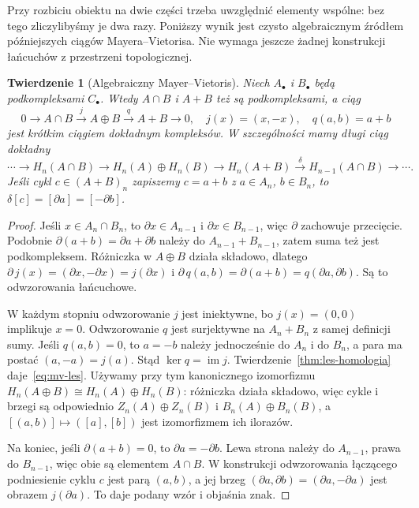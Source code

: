 \documentclass[11pt,a4paper,oneside]{report}
\theoremstyle{plain}
\newtheorem{twierdzenie}{Twierdzenie}[section]
\theoremstyle{definition}
\theoremstyle{remark}
\begin{document}
Przy rozbiciu obiektu na dwie części trzeba
uwzględnić elementy wspólne: bez tego
zliczylibyśmy je dwa razy. Poniższy wynik
jest czysto algebraicznym źródłem
późniejszych ciągów Mayera--Vietorisa.
Nie wymaga jeszcze żadnej konstrukcji
łańcuchów z przestrzeni topologicznej.

\begin{twierdzenie}[Algebraiczny Mayer--Vietoris]
\label{thm:mv-algebraiczny}
Niech $A_\bullet$ i $B_\bullet$ będą
podkompleksami $C_\bullet$. Wtedy
$A\cap B$ i $A+B$ też są podkompleksami,
a ciąg
\begin{equation}\label{eq:mv-ses}
 0\longrightarrow A\cap B
 \xrightarrow{\ j\ }A\oplus B
 \xrightarrow{\ q\ }A+B
 \longrightarrow0,
 \quad j(x)=(x,-x),\quad q(a,b)=a+b
\end{equation}
jest krótkim ciągiem dokładnym kompleksów.
W szczególności mamy długi ciąg dokładny
\begin{equation}\label{eq:mv-les}
 \cdots\to H_n(A\cap B)\to H_n(A)\oplus H_n(B)
 \to H_n(A+B)\xrightarrow{\delta}
 H_{n-1}(A\cap B)\to\cdots.
\end{equation}
Jeśli cykl $c\in(A+B)_n$ zapiszemy
$c=a+b$ z $a\in A_n$, $b\in B_n$,
to $\delta[c]=[\partial a]=[-\partial b]$.
\end{twierdzenie}
\begin{proof}
Jeśli $x\in A_n\cap B_n$, to
$\partial x\in A_{n-1}$ i $\partial x\in B_{n-1}$,
więc $\partial$ zachowuje przecięcie.
Podobnie $\partial(a+b)=\partial a+\partial b$ należy do
$A_{n-1}+B_{n-1}$, zatem suma
też jest podkompleksem.
Różniczka w $A\oplus B$ działa
składowo, dlatego
$\partial\,j(x)=(\partial x,-\partial x)=j(\partial x)$ i
$\partial\,q(a,b)=\partial(a+b)=q(\partial a,\partial b)$.
Są to odwzorowania łańcuchowe.

W każdym stopniu odwzorowanie $j$ jest
iniektywne, bo $j(x)=(0,0)$
implikuje $x=0$. Odwzorowanie $q$ jest
surjektywne na $A_n+B_n$ z samej
definicji sumy. Jeśli $q(a,b)=0$,
to $a=-b$ należy jednocześnie do
$A_n$ i do $B_n$, a para ma postać
$(a,-a)=j(a)$. Stąd
$\ker q=\operatorname{im}j$.
Twierdzenie~\ref{thm:les-homologia}
daje~\eqref{eq:mv-les}. Używamy przy tym kanonicznego izomorfizmu
$H_n(A\oplus B)\cong H_n(A)\oplus H_n(B)$:
różniczka działa składowo, więc cykle i brzegi są odpowiednio
$Z_n(A)\oplus Z_n(B)$ i $B_n(A)\oplus B_n(B)$,
a $[(a,b)]\mapsto([a],[b])$ jest izomorfizmem ich ilorazów.

Na koniec, jeśli $\partial(a+b)=0$, to
$\partial a=-\partial b$. Lewa strona należy do
$A_{n-1}$, prawa do $B_{n-1}$,
więc obie są elementem $A\cap B$.
W konstrukcji odwzorowania łączącego
podniesienie cyklu $c$ jest parą $(a,b)$,
a jej brzeg $(\partial a,\partial b)=(\partial a,-\partial a)$
jest obrazem $j(\partial a)$. To daje
podany wzór i objaśnia znak.
\end{proof}
\end{document}
